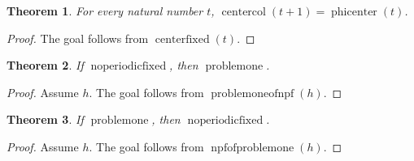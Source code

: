 \documentclass[11pt]{article}
\newtheorem{theorem}{Theorem}[section]
\theoremstyle{definition}
\begin{document}
\begin{theorem}
\label{ll:paper:center-reproduces}
For every natural number \(t\), \(\operatorname{centercol}(t + 1) = \operatorname{phicenter}(t)\).
\end{theorem}
\begin{proof}
The goal follows from \(\operatorname{centerfixed}(t)\).
\end{proof}
\begin{theorem}
\label{ll:paper:fixed-sufficient}
If \(\operatorname{noperiodicfixed}\), then \(\operatorname{problemone}\).
\end{theorem}
\begin{proof}
Assume \(h\).
The goal follows from \(\operatorname{problemoneofnpf}(h)\).
\end{proof}
\begin{theorem}
\label{ll:paper:fixed-necessary}
If \(\operatorname{problemone}\), then \(\operatorname{noperiodicfixed}\).
\end{theorem}
\begin{proof}
Assume \(h\).
The goal follows from \(\operatorname{npfofproblemone}(h)\).
\end{proof}
\end{document}
